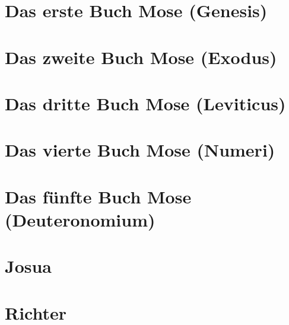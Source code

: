 \chapter{Das erste Buch Mose (Genesis)}
\begin{multicols}{2}
  \raggedcolumns
  \parskip=0pt \relax
  
\end{multicols}

\chapter{Das zweite Buch Mose (Exodus)}
\begin{multicols}{2}
  \raggedcolumns
  \parskip=0pt \relax
  
\end{multicols}

\chapter{Das dritte Buch Mose (Leviticus)}
\begin{multicols}{2}
  \raggedcolumns
  \parskip=0pt \relax
  
\end{multicols}

\chapter{Das vierte Buch Mose (Numeri)}
\begin{multicols}{2}
  \raggedcolumns
  \parskip=0pt \relax
  
\end{multicols}

\chapter{Das fünfte Buch Mose (Deuteronomium)}
\begin{multicols}{2}
  \raggedcolumns
  \parskip=0pt \relax
  
\end{multicols}

\chapter{Josua}
\begin{multicols}{2}
  \raggedcolumns
  \parskip=0pt \relax
  
\end{multicols}

\chapter{Richter}
\begin{multicols}{2}
  \raggedcolumns
  \parskip=0pt \relax
  
\end{multicols}

